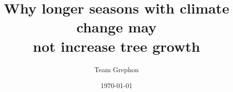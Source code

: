 \documentclass[11pt]{article}
\begin{document}

\title{Why longer seasons with climate change may \\ not increase tree growth} 
\author{Team Grephon}
\date{\today}
\maketitle
\end{document}
